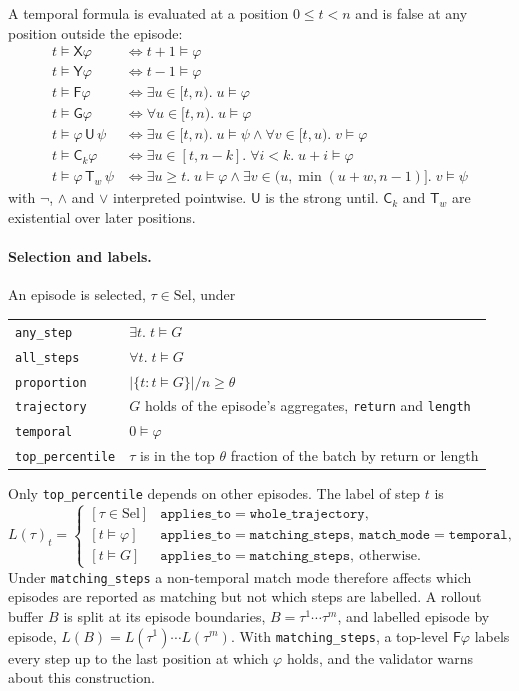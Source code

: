 \documentclass{article}
\begin{document}
A temporal formula is evaluated at a position $0\le t<n$ and is false at
any position outside the episode:
\begin{align*}
t\models\mathsf{X}\varphi &\iff t+1\models\varphi\\
t\models\mathsf{Y}\varphi &\iff t-1\models\varphi\\
t\models\mathsf{F}\varphi &\iff \exists u\in[t,n).\;u\models\varphi\\
t\models\mathsf{G}\varphi &\iff \forall u\in[t,n).\;u\models\varphi\\
t\models\varphi\,\mathsf{U}\,\psi &\iff \exists u\in[t,n).\;u\models\psi\wedge\forall v\in[t,u).\;v\models\varphi\\
t\models\mathsf{C}_k\varphi &\iff \exists u\in[t,n-k].\;\forall i<k.\;u+i\models\varphi\\
t\models\varphi\,\mathsf{T}_w\,\psi &\iff \exists u\ge t.\;u\models\varphi\wedge\exists v\in(u,\min(u+w,n-1)].\;v\models\psi
\end{align*}
with $\neg$, $\wedge$ and $\vee$ interpreted pointwise. $\mathsf{U}$ is
the strong until. $\mathsf{C}_k$ and $\mathsf{T}_w$ are existential over
later positions.

\paragraph{Selection and labels.} An episode is selected,
$\tau\in\mathrm{Sel}$, under
\begin{center}
\begin{tabular}{@{}ll@{}}
\texttt{any\_step} & $\exists t.\;t\models G$ \\
\texttt{all\_steps} & $\forall t.\;t\models G$ \\
\texttt{proportion} & $|\{t: t\models G\}|/n\ge\theta$ \\
\texttt{trajectory} & $G$ holds of the episode's aggregates, \texttt{return} and \texttt{length} \\
\texttt{temporal} & $0\models\varphi$ \\
\texttt{top\_percentile} & $\tau$ is in the top $\theta$ fraction of the batch by return or length
\end{tabular}
\end{center}
Only \texttt{top\_percentile} depends on other episodes. The label of step
$t$ is
\[
L(\tau)_t=\begin{cases}
[\tau\in\mathrm{Sel}] & \texttt{applies\_to}=\texttt{whole\_trajectory},\\
[t\models\varphi] & \texttt{applies\_to}=\texttt{matching\_steps},\ \texttt{match\_mode}=\texttt{temporal},\\
[t\models G] & \texttt{applies\_to}=\texttt{matching\_steps},\ \text{otherwise}.
\end{cases}
\]
Under \texttt{matching\_steps} a non-temporal match mode therefore
affects which episodes are reported as matching but not which steps are
labelled. A rollout buffer $B$ is split at its episode boundaries,
$B=\tau^{1}\cdots\tau^{m}$, and labelled episode by episode,
$L(B)=L(\tau^{1})\cdots L(\tau^{m})$. With \texttt{matching\_steps}, a
top-level $\mathsf{F}\varphi$ labels every step up to the last position
at which $\varphi$ holds, and the validator warns about this
construction.
\end{document}
